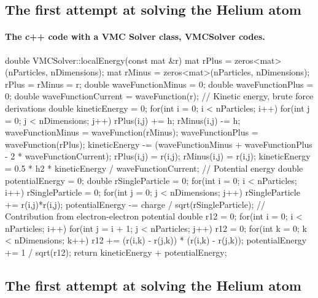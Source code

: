 \documentclass[%
twoside,                 %
final,                   %
10pt]{article}
\begin{document}
\subsection{The first attempt at solving the Helium atom}

\paragraph{The c++ code with a VMC Solver class, VMCSolver codes.}

\bcppcod
double VMCSolver::localEnergy(const mat &r)
{
    mat rPlus = zeros<mat>(nParticles, nDimensions);
    mat rMinus = zeros<mat>(nParticles, nDimensions);
    rPlus = rMinus = r;
    double waveFunctionMinus = 0;
    double waveFunctionPlus = 0;
    double waveFunctionCurrent = waveFunction(r);
    // Kinetic energy, brute force derivations
    double kineticEnergy = 0;
    for(int i = 0; i < nParticles; i++) {
        for(int j = 0; j < nDimensions; j++) {
            rPlus(i,j) += h;
            rMinus(i,j) -= h;
            waveFunctionMinus = waveFunction(rMinus);
            waveFunctionPlus = waveFunction(rPlus);
            kineticEnergy -= (waveFunctionMinus + waveFunctionPlus - 2 * waveFunctionCurrent);
            rPlus(i,j) = r(i,j);
            rMinus(i,j) = r(i,j);
        }
    }
    kineticEnergy = 0.5 * h2 * kineticEnergy / waveFunctionCurrent;
    // Potential energy
    double potentialEnergy = 0;
    double rSingleParticle = 0;
    for(int i = 0; i < nParticles; i++) {
        rSingleParticle = 0;
        for(int j = 0; j < nDimensions; j++) {
            rSingleParticle += r(i,j)*r(i,j);
        }
        potentialEnergy -= charge / sqrt(rSingleParticle);
    }
    // Contribution from electron-electron potential
    double r12 = 0;
    for(int i = 0; i < nParticles; i++) {
        for(int j = i + 1; j < nParticles; j++) {
            r12 = 0;
            for(int k = 0; k < nDimensions; k++) {
                r12 += (r(i,k) - r(j,k)) * (r(i,k) - r(j,k));
            }
            potentialEnergy += 1 / sqrt(r12);
        }
    }
    return kineticEnergy + potentialEnergy;
}
\ecppcod




\subsection{The first attempt at solving the Helium atom}

\end{document}
